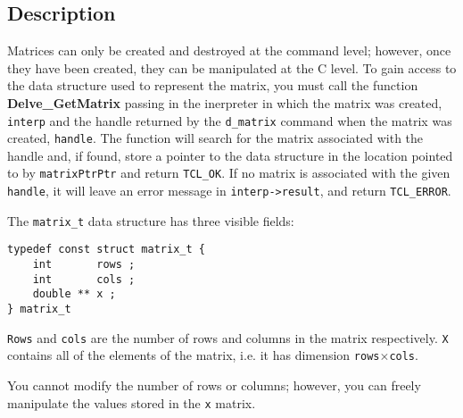 \documentclass{article}
\newcommand{\getmatrix}{\textbf{Delve\_GetMatrix}}
\begin{document}
\subsection{Description}
Matrices can only be created and destroyed at the \tcl{} command
level; however, once they have been created, they can be manipulated
at the C level.  To gain access to the data structure used to
represent the matrix, you must call the function \getmatrix{} passing
in the inerpreter in which the matrix was created, \texttt{interp} and
the handle returned by the \texttt{d\_matrix} command when the matrix
was created, \texttt{handle}.  The function will search for the matrix
associated with the handle and, if found, store a pointer to the data
structure in the location pointed to by \texttt{matrixPtrPtr} and
return \texttt{TCL\_OK}.  If no matrix is associated with the given
\texttt{handle}, it will leave an error message in
\texttt{interp->result}, and return \texttt{TCL\_ERROR}.

The \texttt{matrix\_t} data structure has three visible fields:
\begin{verbatim}
typedef const struct matrix_t {
    int       rows ;
    int       cols ;
    double ** x ;
} matrix_t
\end{verbatim}
\texttt{Rows} and \texttt{cols} are the number of rows and columns in
the matrix respectively.  \texttt{X} contains all of the elements of
the matrix, i.e. it has dimension \texttt{rows$\times$cols}.

You cannot modify the number of rows or columns; however, you can
freely manipulate the values stored in the \texttt{x} matrix.
\end{document}
